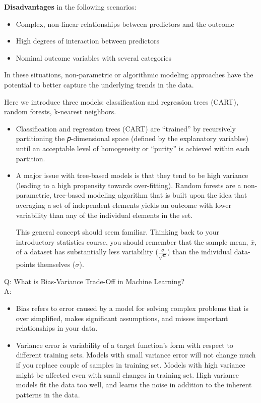 \documentclass[
  a4paper,
  twoside,
  openright]{book}
\providecommand{\tightlist}{%
  \setlength{\itemsep}{0pt}\setlength{\parskip}{0pt}}
\theoremstyle{definition}
\theoremstyle{definition}
\theoremstyle{definition}
\theoremstyle{definition}
\theoremstyle{remark}
\begin{document}
\textbf{Disadvantages} in the following scenarios:

\begin{itemize}
\tightlist
\item
  Complex, non-linear relationships between predictors and the outcome
\item
  High degrees of interaction between predictors
\item
  Nominal outcome variables with several categories
\end{itemize}

In these situations, non-parametric or algorithmic modeling approaches have the potential to better capture the underlying trends in the data.

Here we introduce three models: classification and regression trees (CART), random forests, k-nearest neighbors.

\begin{itemize}
\item
  Classification and regression trees (CART) are ``trained'' by recursively partitioning the 𝑝-dimensional space (defined by the explanatory variables) until an acceptable level of homogeneity or ``purity'' is achieved within each partition.
\item
  A major issue with tree-based models is that they tend to be high variance (leading to a high propensity towards over-fitting). Random forests are a non-parametric, tree-based modeling algorithm that is built upon the idea that averaging a set of independent elements yields an outcome with lower variability than any of the individual elements in the set.

  This general concept should seem familiar. Thinking back to your introductory statistics course, you should remember that the sample mean, \(\overline{x}\), of a dataset has substantially less variability (\(\frac{\sigma}{\sqrt{n}}\)) than the individual data-points themselves (\(\sigma\)).
\end{itemize}

Q: What is Bias-Variance Trade-Off in Machine Learning?\\
A:

\begin{itemize}
\tightlist
\item
  Bias refers to error caused by a model for solving complex problems that is over simplified, makes significant assumptions, and misses important relationships in your data.
\item
  Variance error is variability of a target function's form with respect to different training sets. Models with small variance error will not change much if you replace couple of samples in training set. Models with high variance might be affected even with small changes in training set. High variance models fit the data too well, and learns the noise in addition to the inherent patterns in the data.
\end{itemize}
\end{document}
